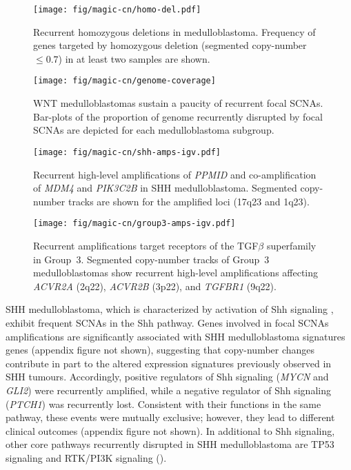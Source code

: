 \begin{SCfigure}[5]
	\centering
	\texttt{[image: fig/magic-cn/homo-del.pdf]}
	\caption[Recurrent homozygous deletions in medulloblastoma]
	{
	Recurrent homozygous deletions in medulloblastoma.
	Frequency of genes targeted by homozygous deletion (segmented copy-number $\leq 0.7$) in at least two samples are shown.
	}
	\label{fig:homo-del}
\end{SCfigure}

\begin{SCfigure}[5]
	\centering
	\texttt{[image: fig/magic-cn/genome-coverage]}
	\caption[WNT medulloblastomas sustain a paucity of recurrent focal SCNAs.]
	{
	WNT medulloblastomas sustain a paucity of recurrent focal SCNAs.
	Bar-plots of the proportion of genome recurrently disrupted by focal SCNAs are depicted for each medulloblastoma subgroup.
	}
	\label{fig:genome-coverage}
\end{SCfigure}

\clearpage

\begin{SCfigure}[1][t]
	\centering
	\texttt{[image: fig/magic-cn/shh-amps-igv.pdf]}
	\caption[Recurrent amplifications of \emph{PPMID}, \emph{MDM4}, and \emph{PIK3C2B} in SHH medulloblastoma]
	{
	Recurrent high-level amplifications of \emph{PPMID} and co-amplification of \emph{MDM4} and \emph{PIK3C2B} in SHH medulloblastoma.
	Segmented copy-number tracks are shown for the amplified loci (17q23 and 1q23).
	}
	\label{fig:shh-amps-igv}
\end{SCfigure}

\begin{SCfigure}[1][b]
	\centering
	\texttt{[image: fig/magic-cn/group3-amps-igv.pdf]}
	\caption[Recurrent amplifications target receptors of the TGF$\beta$ superfamily in Group~3]
	{
	Recurrent amplifications target receptors of the TGF$\beta$ superfamily in Group~3.
	Segmented copy-number tracks of Group~3 medulloblastomas show recurrent high-level amplifications affecting \emph{ACVR2A} (2q22), \emph{ACVR2B} (3p22), and \emph{TGFBR1} (9q22).
	}
	\label{fig:group3-amps-igv}
\end{SCfigure}

\clearpage

SHH medulloblastoma, which is characterized by activation of Shh signaling , exhibit frequent SCNAs in the Shh pathway. Genes involved in focal SCNAs amplifications are significantly associated with SHH medulloblastoma signatures genes (appendix figure not shown), suggesting that copy-number changes contribute in part to the altered expression signatures previously observed in SHH tumours. Accordingly, positive regulators of Shh signaling (\emph{MYCN} and \emph{GLI2}) were recurrently amplified, while a negative regulator of Shh signaling (\emph{PTCH1}) was recurrently lost. Consistent with their functions in the same pathway, these events were mutually exclusive; however, they lead to different clinical outcomes (appendix figure not shown). In additional to Shh signaling, other core pathways recurrently disrupted in SHH medulloblastoma are TP53 signaling and RTK/PI3K signaling ().

